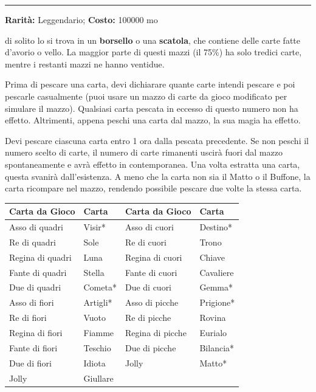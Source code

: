 \begin{multicols}{2}
\medskip

\smallskip\noindent\rule{\linewidth}{2pt}  \hypertarget{MazzodelleMeraviglie}{}\medskip{}\noindent\label{MazzodelleMeraviglie}

\textbf{Rarità:} Leggendario; \textbf{Costo:} 100000 mo

di solito lo si trova in un \textbf{borsello} o una \textbf{scatola}, che contiene delle carte fatte d'avorio o vello. La maggior parte di questi mazzi (il 75\%) ha solo tredici carte, mentre i restanti mazzi ne hanno ventidue.

Prima di pescare una carta, devi dichiarare quante carte intendi pescare e poi pescarle casualmente (puoi usare un mazzo di carte da gioco modificato per simulare il mazzo). Qualsiasi carta pescata in eccesso di questo numero non ha effetto. Altrimenti, appena peschi una carta dal mazzo, la sua magia ha effetto.

Devi pescare ciascuna carta entro 1 ora dalla pescata precedente. Se non peschi il numero scelto di carte, il numero di carte rimanenti uscirà fuori dal mazzo spontaneamente e avrà effetto in contemporanea. Una volta estratta una carta, questa svanirà dall'esistenza. A meno che la carta non sia il Matto o il Buffone, la carta ricompare nel mazzo, rendendo possibile pescare due volte la stessa carta.

\medskip


\begin{adjustbox}{max width=0.5\textwidth}
\begin{tabular}{>{\raggedright\arraybackslash}p{}|>{\raggedright\arraybackslash}p{}>{\raggedright\arraybackslash}p{}|>{\raggedright\arraybackslash}p{}}
\textbf{Carta da Gioco} & \textbf{Carta} & \textbf{Carta da Gioco} & \textbf{Carta} \\
\hline
Asso di quadri & Visir* & Asso di cuori & Destino* \\
Re di quadri & Sole & Re di cuori & Trono \\
Regina di quadri & Luna & Regina di cuori & Chiave \\
Fante di quadri & Stella & Fante di cuori & Cavaliere \\
Due di quadri & Cometa* & Due di cuori & Gemma* \\
Asso di fiori & Artigli* & Asso di picche & Prigione* \\
Re di fiori & Vuoto & Re di picche & Rovina \\
Regina di fiori & Fiamme & Regina di picche & Eurialo \\
Fante di fiori & Teschio & Due di picche & Bilancia* \\
Due di fiori & Idiota & Jolly & Matto* \\
Jolly & Giullare & & \\
\end{tabular}
\end{adjustbox}


\end{multicols}
